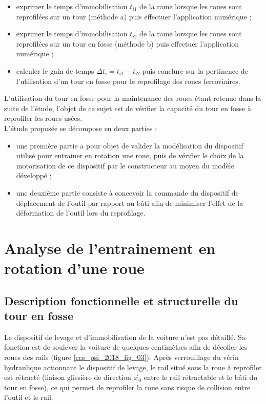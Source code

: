 \begin{itemize}
  \item exprimer le temps d'immobilisation $t_{i 1}$ de la rame lorsque les roues sont reprofilées sur un tour (méthode a) puis effectuer l'application numérique ;
  \item exprimer le temps d'immobilisation $t_{i 2}$ de la rame lorsque les roues sont reprofilées sur un tour en fosse (méthode b) puis effectuer l'application numérique ;
  \item calculer le gain de temps $\Delta t_{i}=t_{i 1}-t_{i 2}$ puis conclure sur la pertinence de l'utilisation d'un tour en fosse pour le reprofilage des roues ferroviaires.
  \end{itemize}


L'utilisation du tour en fosse pour la maintenance des roues étant retenue dans la suite de l'étude, l'objet de ce sujet est de vérifier la capacité du tour en fosse à reprofiler les roues usées.\\
L'étude proposée se décompose en deux parties :
\begin{itemize}
  \item une première partie a pour objet de valider la modélisation du dispositif utilisé pour entrainer en rotation une roue, puis de vérifier le choix de la motorisation de ce dispositif par le constructeur au moyen du modèle développé ;
  \item une deuxième partie consiste à concevoir la commande du dispositif de déplacement de l'outil par rapport au bâti afin de minimiser l'effet de la déformation de l'outil lors du reprofilage.
\end{itemize}

\section{Analyse de l'entrainement en rotation d'une roue}
\subsection{Description fonctionnelle et structurelle du tour en fosse}
Le dispositif de levage et d'immobilisation de la voiture n'est pas détaillé. Sa fonction est de soulever la voiture de quelques centimètres afin de décoller les roues des rails (figure \ref{ccs_psi_2018_fig_03}). Après verrouillage du vérin hydraulique actionnant le dispositif de levage, le rail situé sous la roue à reprofiler est rétracté (liaison glissière de direction $\vec{x}_{0}$ entre le rail rétractable et le bâti du tour en fosse), ce qui permet de reprofiler la roue sans risque de collision entre l'outil et le rail.

